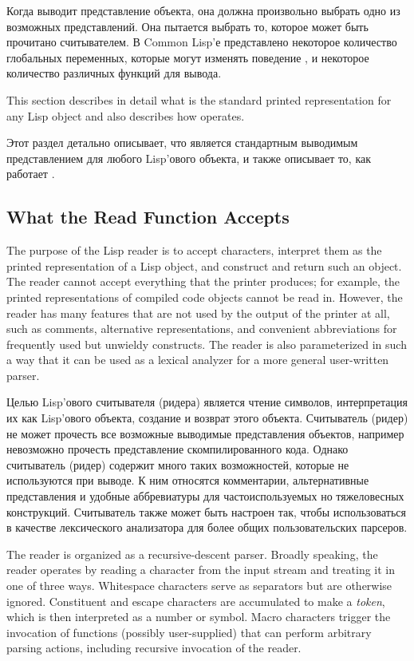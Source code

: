 Когда  выводит представление объекта, она должна произвольно выбрать
одно из возможных представлений. Она пытается выбрать то, которое может быть
прочитано считывателем. В Common Lisp'е представлено некоторое количество
глобальных переменных, которые могут изменять поведение , и некоторое
количество различных функций для вывода.

This section describes in detail what is the standard printed
representation for any Lisp object and also describes how  operates.

Этот раздел детально описывает, что является стандартным выводимым
представлением для любого Lisp'ового объекта, и также описывает то, как работает
.

\subsection{What the Read Function Accepts}
\label{READER}

The purpose of the Lisp reader is to accept characters, interpret them
as the printed representation of a Lisp object, and construct and
return such an object.  The reader cannot accept everything that the
printer produces; for example, the printed representations of compiled
code objects cannot be read in.  However, the reader has
many features that are not used by the output of the printer at all,
such as comments, alternative representations, and convenient
abbreviations for frequently used but unwieldy constructs.  The reader is
also parameterized in such a way that it can be used as a lexical
analyzer for a more general user-written parser.

Целью Lisp'ового считывателя (ридера) является чтение символов, интерпретация их
как Lisp'ового объекта, создание и возврат этого объекта.
Считыватель (ридер) не может прочесть все возможные выводимые представления
объектов, например невозможно прочесть представление скомпилированного
кода. Однако считыватель (ридер) содержит много таких возможностей, которые не
используются при выводе. К ним относятся комментарии, альтернативные
представления и удобные аббревиатуры для частоиспользуемых но тяжеловесных
конструкций. Считыватель также может быть настроен так, чтобы использоваться в
качестве лексического анализатора для более общих пользовательских парсеров.

The reader is organized as a recursive-descent parser.
Broadly speaking,
the reader operates by reading a character from
the input stream and treating it in one of three ways.
Whitespace characters serve as separators but are otherwise
ignored.  Constituent and escape characters are accumulated
to make a \emph{token}, which is then interpreted as a number or symbol.
Macro characters trigger the invocation of functions (possibly
user-supplied) that can perform arbitrary parsing actions,
including recursive invocation of the reader.

